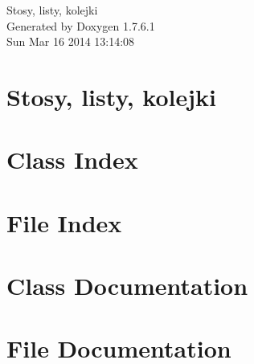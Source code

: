 \documentclass[a4paper]{book}
\begin{document}
\hypersetup{pageanchor=false,citecolor=blue}
\begin{titlepage}
\vspace*{7cm}
\begin{center}
{\Large \-Stosy, listy, kolejki }\\
\vspace*{1cm}
{\large \-Generated by Doxygen 1.7.6.1}\\
\vspace*{0.5cm}
{\small Sun Mar 16 2014 13:14:08}\\
\end{center}
\end{titlepage}
\clearemptydoublepage
{}
\tableofcontents
\clearemptydoublepage
{}
\hypersetup{pageanchor=true,citecolor=blue}
\chapter{\-Stosy, listy, kolejki}
\label{index}\hypertarget{index}{}
\chapter{\-Class \-Index}

\chapter{\-File \-Index}

\chapter{\-Class \-Documentation}







\chapter{\-File \-Documentation}












\printindex
\end{document}
